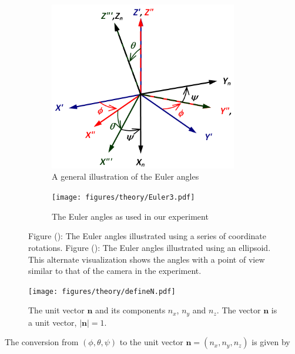 \begin{figure}[H]
\centering
\begin{subfigure}[b]{0.45\textwidth}
\includegraphics[width=0.9\textwidth]{figures/theory/eulerangles.png}
\caption{A general illustration of the Euler angles}
\label{fig:eulerangles}
\end{subfigure}
\begin{subfigure}[b]{0.45\textwidth}
\texttt{[image: figures/theory/Euler3.pdf]}
\caption{The Euler angles as used in our experiment}
\label{fig:eulerparticle}
\end{subfigure}
\caption{Figure (): The Euler angles illustrated using a series of coordinate rotations. 
Figure (): The Euler angles illustrated using an ellipsoid. This alternate visualization shows the angles with a point of view similar to that of the camera in the experiment. }\label{fig:eulerplots}
\end{figure}


\begin{figure}[H]
\begin{center}
\texttt{[image: figures/theory/defineN.pdf]}
\end{center}
\caption{The unit vector $\mathbf{n}$ and its components $n_x$, $n_y$ and $n_z$. The vector $\mathbf{n}$ is a unit vector, $|\mathbf{n}| = 1$.}
\label{fig:nDef}
\end{figure}

The conversion from $(\phi, \theta, \psi)$ to the unit vector $\mathbf{n} = (n_x, n_y, n_z)$ is given by 

